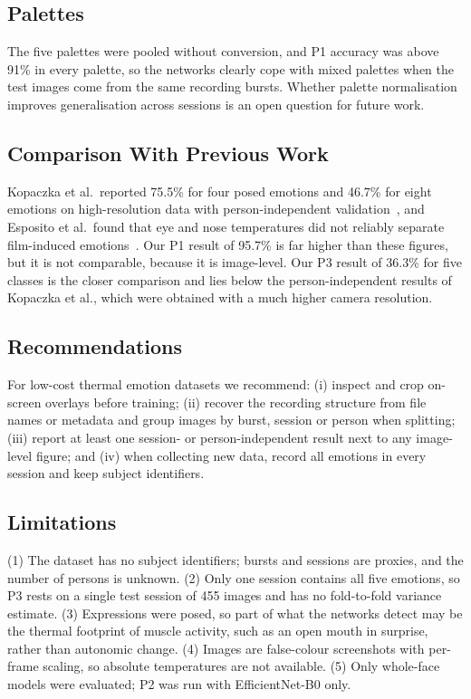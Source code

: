 \documentclass[10pt,twocolumn,letterpaper]{article}
\begin{document}
\subsection{Palettes}
The five palettes were pooled without conversion, and P1 accuracy was above 91\% in every palette, so the networks clearly cope with mixed palettes when the test images come from the same recording bursts. Whether palette normalisation improves generalisation across sessions is an open question for future work.

\subsection{Comparison With Previous Work}
Kopaczka et al.\ reported 75.5\% for four posed emotions and 46.7\% for eight emotions on high-resolution data with person-independent validation~\cite{kopaczka2019}, and Esposito et al.\ found that eye and nose temperatures did not reliably separate film-induced emotions~\cite{esposito2022}. Our P1 result of 95.7\% is far higher than these figures, but it is not comparable, because it is image-level. Our P3 result of 36.3\% for five classes is the closer comparison and lies below the person-independent results of Kopaczka et al., which were obtained with a much higher camera resolution.

\subsection{Recommendations}
For low-cost thermal emotion datasets we recommend: (i) inspect and crop on-screen overlays before training; (ii) recover the recording structure from file names or metadata and group images by burst, session or person when splitting; (iii) report at least one session- or person-independent result next to any image-level figure; and (iv) when collecting new data, record all emotions in every session and keep subject identifiers.

\subsection{Limitations}
(1) The dataset has no subject identifiers; bursts and sessions are proxies, and the number of persons is unknown. (2) Only one session contains all five emotions, so P3 rests on a single test session of 455 images and has no fold-to-fold variance estimate. (3) Expressions were posed, so part of what the networks detect may be the thermal footprint of muscle activity, such as an open mouth in surprise, rather than autonomic change. (4) Images are false-colour screenshots with per-frame scaling, so absolute temperatures are not available. (5) Only whole-face models were evaluated; P2 was run with EfficientNet-B0 only.
\end{document}
